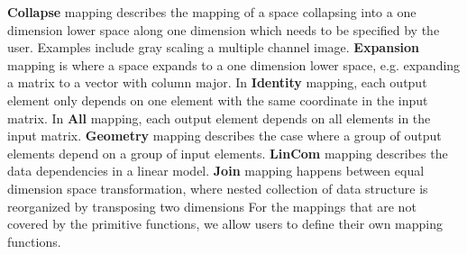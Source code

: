 \documentclass{sig-alternate}
\begin{document}
{\bf Collapse} mapping describes the mapping of a space collapsing into a one dimension lower space along one dimension which needs
to be specified by the user. Examples include gray scaling a multiple channel image.
{\bf Expansion} mapping is where a space expands to a one dimension lower space, e.g. expanding a matrix to a vector with column major.
In {\bf Identity} mapping, each output element only depends on one element with the same coordinate in the input matrix.
In {\bf All} mapping, each output element depends on all elements in the input matrix.
{\bf Geometry} mapping describes the case where a group of output elements depend on a group of input elements.
{\bf LinCom} mapping describes the data dependencies in a linear model.
{\bf Join} mapping happens between equal dimension space transformation, where nested collection of data structure is reorganized by 
transposing two dimensions
For the mappings that are not covered by the primitive functions, we allow users to define their own mapping functions.


\end{document}
